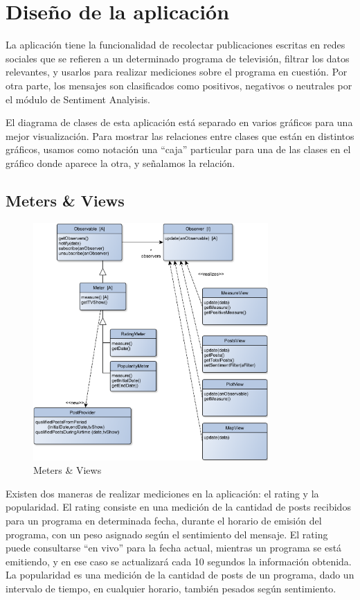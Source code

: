
\section{Diseño de la aplicación}


La aplicación tiene la funcionalidad de recolectar publicaciones escritas en redes sociales que se refieren a un determinado programa de televisión, filtrar los datos relevantes, y usarlos para realizar mediciones sobre el programa en cuestión. 
Por otra parte, los mensajes son clasificados como positivos, negativos o neutrales por el módulo de Sentiment Analyisis.
\bigskip

El diagrama de clases de esta aplicación está separado en varios gráficos para una mejor visualización. Para mostrar las relaciones entre clases que están en distintos gráficos, usamos como notación una ``caja'' particular para una de las clases en el gráfico donde aparece la otra, y señalamos la relación.

\subsection{Meters \& Views}

\begin{figure}[H]
\centering
\includegraphics[width=0.8\textwidth]{graph/clase/meters.pdf}
\caption{Meters \& Views}
\end{figure}

Existen dos maneras de realizar mediciones en la aplicación: el rating y la popularidad. El rating consiste en una medición de la cantidad de posts recibidos para un programa en determinada fecha, durante el horario de emisión del programa, con un peso asignado según el sentimiento del mensaje. El rating puede consultarse ``en vivo'' para la fecha actual, mientras un programa se está emitiendo, y en ese caso se actualizará cada 10 segundos la información obtenida. La popularidad es una medición de la cantidad de posts de un programa, dado un intervalo de tiempo, en cualquier horario, también pesados según sentimiento.
\bigskip

